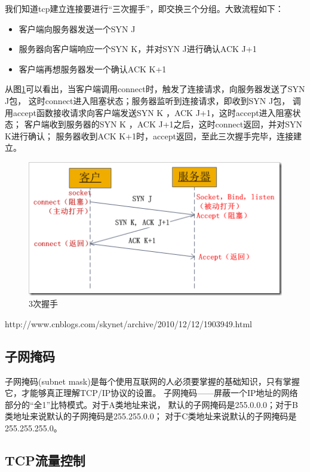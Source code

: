 \documentclass{book}
\begin{document}
我们知道tcp建立连接要进行“三次握手”，即交换三个分组。大致流程如下：

\begin{itemize}
	\item{客户端向服务器发送一个SYN J}
	\item{服务器向客户端响应一个SYN K，并对SYN J进行确认ACK J+1}
	\item{客户端再想服务器发一个确认ACK K+1}
\end{itemize}

从图\ref{fig:ThreeHandShake}可以看出，当客户端调用connect时，触发了连接请求，向服务器发送了SYN J包，
这时connect进入阻塞状态；服务器监听到连接请求，即收到SYN J包，
调用accept函数接收请求向客户端发送SYN K ，ACK J+1，这时accept进入阻塞状态；
客户端收到服务器的SYN K ，ACK J+1之后，这时connect返回，并对SYN K进行确认；
服务器收到ACK K+1时，accept返回，至此三次握手完毕，连接建立。

\begin{figure}[htbp]
	\centering
	\includegraphics[scale=0.7]{ThreeHandShake.png}
	\caption{3次握手}
	\label{fig:ThreeHandShake}
\end{figure}

http://www.cnblogs.com/skynet/archive/2010/12/12/1903949.html

\subsection{子网掩码}

子网掩码(subnet mask)是每个使用互联网的人必须要掌握的基础知识，只有掌握它，才能够真正理解TCP/IP协议的设置。
子网掩码——屏蔽一个IP地址的网络部分的“全1”比特模式。对于A类地址来说，
默认的子网掩码是255.0.0.0；对于B类地址来说默认的子网掩码是255.255.0.0；
对于C类地址来说默认的子网掩码是255.255.255.0。


\subsection{TCP流量控制}
\end{document}
